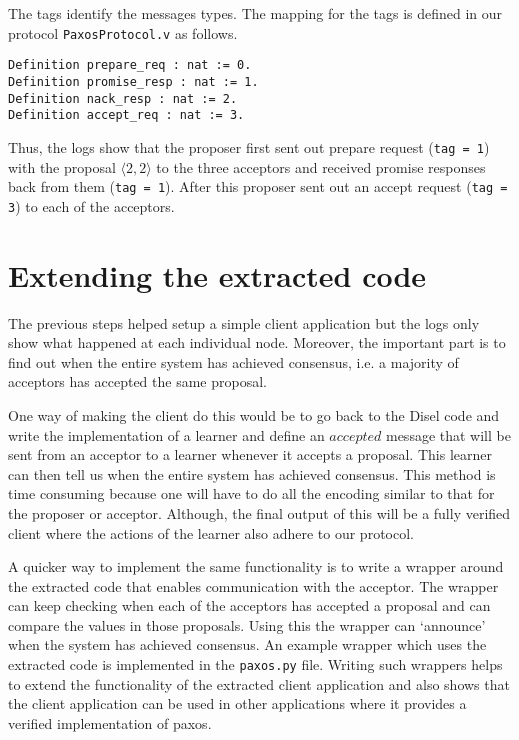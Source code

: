 The tags identify the messages types. The mapping for the tags is defined in
our protocol \texttt{PaxosProtocol.v} as follows.

\begin{lstlisting}
Definition prepare_req : nat := 0.
Definition promise_resp : nat := 1.
Definition nack_resp : nat := 2.
Definition accept_req : nat := 3.
\end{lstlisting}

Thus, the logs show that the proposer first sent out prepare request
(\texttt{tag = 1}) with the proposal $\langle 2, 2 \rangle$
to the three acceptors and received promise responses back from them (\texttt{tag = 1}).
After this proposer sent out an accept request (\texttt{tag = 3}) to each of
the acceptors.

\section{Extending the extracted code}
The previous steps helped setup a simple client application but the logs
only show what happened at each individual node. Moreover, the important part is
to find out when the entire system has achieved consensus, i.e. a majority of
acceptors has accepted the same proposal.

One way of making the client do this would be to go back to the Disel code and
write the implementation of a learner and define an $accepted$ message that will
be sent from an acceptor to a learner whenever it accepts a proposal. This learner
can then tell us when the entire system has achieved consensus. This method is
time consuming because one will have to do all the encoding similar to that for
the proposer or acceptor. Although, the final output of this will be a fully
verified client where the actions of the learner also adhere to our protocol.

A quicker way to implement the same functionality is to write a
wrapper around the extracted code that enables communication with the
acceptor. The wrapper can keep checking when each of the acceptors has accepted
a proposal and can compare the values in those proposals. Using this the wrapper
can `announce' when the system has achieved consensus. An example wrapper which
uses the extracted code is implemented in the \texttt{paxos.py} file.
Writing such wrappers helps to extend the functionality of the extracted
client application and also shows that the client application can be used in
other applications where it provides a verified implementation of paxos.


